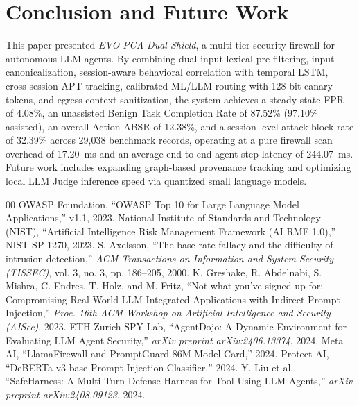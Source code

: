 \documentclass[conference]{IEEEtran}
\begin{document}
\section{Conclusion and Future Work}
This paper presented \textit{EVO-PCA Dual Shield}, a multi-tier security firewall for autonomous LLM agents. By combining dual-input lexical pre-filtering, input canonicalization, session-aware behavioral correlation with temporal LSTM, cross-session APT tracking, calibrated ML/LLM routing with 128-bit canary tokens, and egress context sanitization, the system achieves a steady-state FPR of 4.08\%, an unassisted Benign Task Completion Rate of 87.52\% (97.10\% assisted), an overall Action ABSR of 12.38\%, and a session-level attack block rate of 32.39\% across 29,038 benchmark records, operating at a pure firewall scan overhead of 17.20~ms and an average end-to-end agent step latency of 244.07~ms. Future work includes expanding graph-based provenance tracking and optimizing local LLM Judge inference speed via quantized small language models.

\begin{thebibliography}{00}
 OWASP Foundation, ``OWASP Top 10 for Large Language Model Applications,'' v1.1, 2023.
 National Institute of Standards and Technology (NIST), ``Artificial Intelligence Risk Management Framework (AI RMF 1.0),'' NIST SP 1270, 2023.
 S. Axelsson, ``The base-rate fallacy and the difficulty of intrusion detection,'' \textit{ACM Transactions on Information and System Security (TISSEC)}, vol. 3, no. 3, pp. 186--205, 2000.
 K. Greshake, R. Abdelnabi, S. Mishra, C. Endres, T. Holz, and M. Fritz, ``Not what you've signed up for: Compromising Real-World LLM-Integrated Applications with Indirect Prompt Injection,'' \textit{Proc. 16th ACM Workshop on Artificial Intelligence and Security (AISec)}, 2023.
 ETH Zurich SPY Lab, ``AgentDojo: A Dynamic Environment for Evaluating LLM Agent Security,'' \textit{arXiv preprint arXiv:2406.13374}, 2024.
 Meta AI, ``LlamaFirewall and PromptGuard-86M Model Card,'' 2024.
 Protect AI, ``DeBERTa-v3-base Prompt Injection Classifier,'' 2024.
 Y. Liu et al., ``SafeHarness: A Multi-Turn Defense Harness for Tool-Using LLM Agents,'' \textit{arXiv preprint arXiv:2408.09123}, 2024.
\end{thebibliography}
\end{document}
